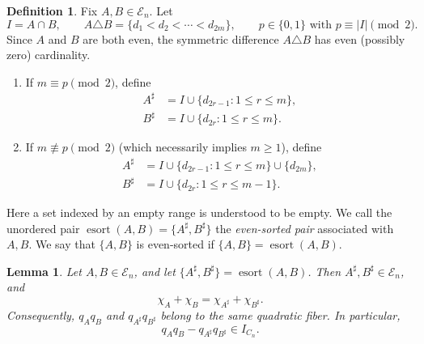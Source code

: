 \documentclass[11pt]{amsart}
\newtheorem{lemma}[theorem]{Lemma}
\theoremstyle{definition}
\newtheorem{definition}[theorem]{Definition}
\newcommand{\En}{\mathcal E_n}
\newcommand{\esort}{\operatorname{esort}}
\numberwithin{equation}{section}
\begin{document}
\begin{definition} \label{def:evensort}
Fix $A,B\in\En$. 
Let
\[
I=A\cap B,
 \qquad
A\triangle B=\{d_1<d_2<\cdots<d_{2m}\},
 \qquad
p\in\{0,1\} \mbox{ with } p\equiv |I|\pmod2.
\]
Since $A$ and $B$ are both even,
the symmetric difference $A \triangle B$ has even (possibly zero) cardinality.
\begin{enumerate}
    \item 
If $m\equiv p\pmod2$, define
\begin{align*}
 A^\sharp&=I\cup\{d_{2r-1}:1\le r\le m\},\\
 B^\sharp&=I\cup\{d_{2r}:1\le r\le m\}.
\end{align*}
\item
If $m\not\equiv p\pmod2$ (which necessarily implies $m\ge1$), define
\begin{align*}
 A^\sharp&=I\cup\{d_{2r-1}:1\le r\le m\}\cup\{d_{2m}\},\\
 B^\sharp&=I\cup\{d_{2r}:1\le r\le m-1\}.
\end{align*}
\end{enumerate}
Here a set indexed by an empty range is understood to be empty. We call the unordered pair $\esort(A,B)=\{A^\sharp,B^\sharp\}$ the \emph{even-sorted pair} associated with $A,B$. We say that $\{A,B\}$ is even-sorted if $\{A,B\}=\esort(A,B)$.
\end{definition}

\begin{lemma}\label{lem:sortingfiber}
Let $A,B\in\En$, and let
$\{A^\sharp,B^\sharp\}=\esort(A,B)$. Then
$A^\sharp,B^\sharp\in\En$, and 
\[
 \chi_A+\chi_B=\chi_{A^\sharp}+\chi_{B^\sharp}.
\]
Consequently, $q_Aq_B$ and
$q_{A^\sharp}q_{B^\sharp}$ belong to the same quadratic fiber.
In particular,
\[
 q_Aq_B-q_{A^\sharp}q_{B^\sharp}\in I_{C_n}.
\]
\end{lemma}
\end{document}
